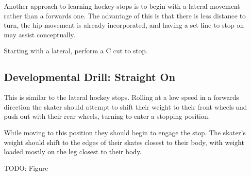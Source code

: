Another approach to learning hockey stops is to begin with a lateral movement rather than a forwards one.    
The advantage of this is that there is less distance to turn, the hip movement is already incorporated, and having a set line to stop on may assist conceptually.   


Starting with a lateral, perform a C cut to stop. 


\subsection*{Developmental Drill: Straight On}

This is similar to the lateral hockey stops. 
Rolling at a low speed in a forwards direction the skater should attempt to shift their weight to their front wheels and push out with their rear wheels, turning to enter a stopping position. 

While moving to this position they should begin to engage the stop.
The skater's weight should shift to the edges of their skates closest to their body, with weight loaded mostly on the leg closest to their body. 

{\color{red} TODO: Figure}
